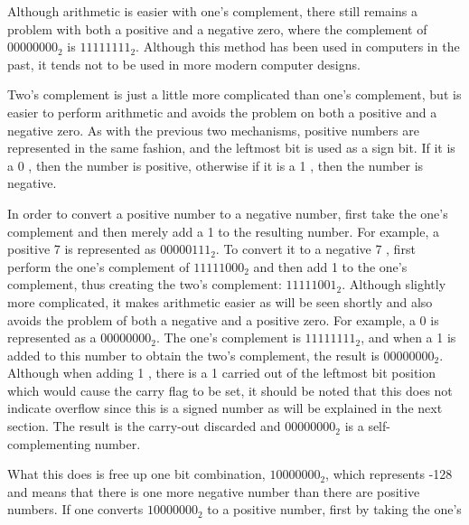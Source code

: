 \documentclass[10pt]{article}
\begin{document}
Although arithmetic is easier with one's complement, there still remains a problem with both a positive and a negative zero, where the complement of $00000000_{2}$ is $11111111_{2}$. Although this method has been used in computers in the past, it tends not to be used in more modern computer designs.

Two's complement is just a little more complicated than one's complement, but is easier to perform arithmetic and avoids the problem on both a positive and a negative zero. As with the previous two mechanisms, positive numbers are represented in the same fashion, and the leftmost bit is used as a sign bit. If it is a 0 , then the number is positive, otherwise if it is a 1 , then the number is negative.

In order to convert a positive number to a negative number, first take the one's complement and then merely add a 1 to the resulting number. For example, a positive 7 is represented as $00000111_{2}$. To convert it to a negative 7 , first perform the one's complement of $11111000_{2}$ and then add 1 to the one's complement, thus creating the two's complement: $11111001_{2}$. Although slightly more complicated, it makes arithmetic easier as will be seen shortly and also avoids the problem of both a negative and a positive zero. For example, a 0 is represented as a $00000000_{2}$. The one's complement is $11111111_{2}$, and when a 1 is added to this number to obtain the two's complement, the result is $00000000_{2}$. Although when adding 1 , there is a 1 carried out of the leftmost bit position which would cause the carry flag to be set, it should be noted that this does not indicate overflow since this is a signed number as will be explained in the next section. The result is the carry-out discarded and $00000000_{2}$ is a self-complementing number.

What this does is free up one bit combination, $10000000_{2}$, which represents -128 and means that there is one more negative number than there are positive numbers. If one converts $10000000_{2}$ to a positive number, first by taking the one's
\end{document}
